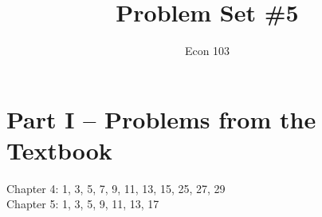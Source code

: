 \documentclass[addpoints,12pt]{exam}
\title{Problem Set \#5}
\author{Econ 103}
\date{}
\begin{document}
\maketitle


\section*{Part I -- Problems from the Textbook}
Chapter 4: 1, 3, 5, 7, 9, 11, 13, 15, 25, 27, 29\\
Chapter 5: 1, 3, 5, 9, 11, 13, 17


\end{document}
